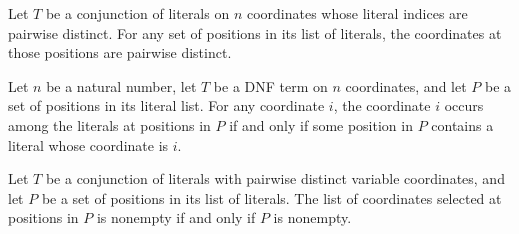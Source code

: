 \begin{theorem}
\label{FABL.DNFTerm.coordinatesAtPositions_nodup}
\leanok
{}
Let $T$ be a conjunction of literals on $n$ coordinates whose literal indices are
pairwise distinct. For any set of positions in its list of literals, the coordinates at
those positions are pairwise distinct.
\end{theorem}

\begin{theorem}
\label{FABL.DNFTerm.mem_coordinatesAtPositions_iff}
\leanok
{}
Let $n$ be a natural number, let $T$ be a DNF term on $n$ coordinates, and let $P$ be a
set of positions in its literal list. For any coordinate $i$, the coordinate $i$ occurs
among the literals at positions in $P$ if and only if some position in $P$ contains a
literal whose coordinate is $i$.
\end{theorem}

\begin{theorem}
\label{FABL.DNFTerm.coordinatesAtPositions_nonempty_iff}
\leanok
{}
Let $T$ be a conjunction of literals with pairwise distinct variable coordinates, and
let $P$ be a set of positions in its list of literals. The list of coordinates selected
at positions in $P$ is nonempty if and only if $P$ is nonempty.
\end{theorem}

